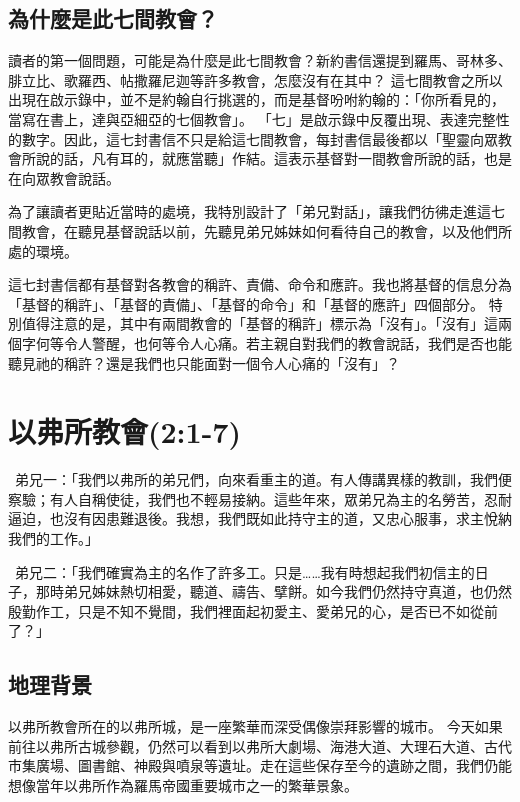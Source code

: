 \subsection{為什麼是此七間教會？}

讀者的第一個問題，可能是為什麼是此七間教會？新約書信還提到羅馬、哥林多、腓立比、歌羅西、帖撒羅尼迦等許多教會，怎麼沒有在其中？
這七間教會之所以出現在啟示錄中，並不是約翰自行挑選的，而是基督吩咐約翰的：「你所看見的，當寫在書上，達與亞細亞的七個教會」。
「七」是啟示錄中反覆出現、表達完整性的數字。因此，這七封書信不只是給這七間教會，每封書信最後都以「聖靈向眾教會所說的話，凡有耳的，就應當聽」作結。這表示基督對一間教會所說的話，也是在向眾教會說話。

為了讓讀者更貼近當時的處境，我特別設計了「弟兄對話」，讓我們彷彿走進這七間教會，在聽見基督說話以前，先聽見弟兄姊妹如何看待自己的教會，以及他們所處的環境。

這七封書信都有基督對各教會的稱許、責備、命令和應許。我也將基督的信息分為「基督的稱許」、「基督的責備」、「基督的命令」和「基督的應許」四個部分。
特別值得注意的是，其中有兩間教會的「基督的稱許」標示為「沒有」。「沒有」這兩個字何等令人警醒，也何等令人心痛。若主親自對我們的教會說話，我們是否也能聽見祂的稱許？還是我們也只能面對一個令人心痛的「沒有」？

\section{以弗所教會(2:1-7)}

\begin{DialogueBox}
\noindent\faUser\ 弟兄一：「我們以弗所的弟兄們，向來看重主的道。有人傳講異樣的教訓，我們便察驗；有人自稱使徒，我們也不輕易接納。這些年來，眾弟兄為主的名勞苦，忍耐逼迫，也沒有因患難退後。我想，我們既如此持守主的道，又忠心服事，求主悅納我們的工作。」

\noindent\faUser\ 弟兄二：「我們確實為主的名作了許多工。只是……我有時想起我們初信主的日子，那時弟兄姊妹熱切相愛，聽道、禱告、擘餅。如今我們仍然持守真道，也仍然殷勤作工，只是不知不覺間，我們裡面起初愛主、愛弟兄的心，是否已不如從前了？」
\end{DialogueBox}

\subsection{地理背景}
以弗所教會所在的以弗所城，是一座繁華而深受偶像崇拜影響的城市。
今天如果前往以弗所古城參觀，仍然可以看到以弗所大劇場、海港大道、大理石大道、古代市集廣場、圖書館、神殿與噴泉等遺址。走在這些保存至今的遺跡之間，我們仍能想像當年以弗所作為羅馬帝國重要城市之一的繁華景象。

